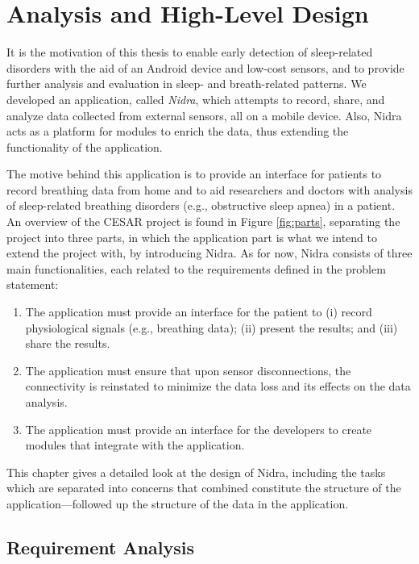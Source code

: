 
\chapter{Analysis and High-Level Design}

It is the motivation of this thesis to enable early detection of sleep-related disorders with the aid of an Android device and low-cost sensors, and to provide further analysis and evaluation in sleep- and breath-related patterns. We developed an application, called \textit{Nidra}, which attempts to record, share, and analyze data collected from external sensors, all on a mobile device. Also, Nidra acts as a platform for modules to enrich the data, thus extending the functionality of the application.

The motive behind this application is to provide an interface for patients to record breathing data from home and to aid researchers and doctors with analysis of sleep-related breathing disorders (e.g., obstructive sleep apnea) in a patient. An overview of the CESAR project is found in Figure \ref{fig:parts}, separating the project into three parts, in which the application part is what we intend to extend the project with, by introducing Nidra. As for now, Nidra consists of three main functionalities, each related to the requirements defined in the problem statement:  

\begin{enumerate}
    \item The application must provide an interface for the patient to (i) record physiological signals (e.g., breathing data); (ii) present the results; and (iii) share the results.
    \item The application must ensure that upon sensor disconnections, the connectivity is reinstated to minimize the data loss and its effects on the data analysis.
    \item The application must provide an interface for the developers to create modules that integrate with the application.
\end{enumerate}

This chapter gives a detailed look at the design of Nidra, including the tasks which are separated into concerns that combined constitute the structure of the application---followed up the structure of the data in the application.

\section{Requirement Analysis}

